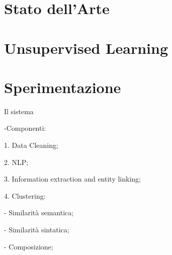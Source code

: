 \documentclass[a4paper,12pt,oneside]{book}
\begin{document}
\label{cap:capitoloIntro}

\chapter{Stato dell'Arte}
\label{cap:capitolo1}

\chapter{Unsupervised Learning}
\label{cap:capitolo2}

\chapter{Sperimentazione}
\color{red}
Il sistema

-Componenti:

1. Data Cleaning;

2. NLP;

3. Information extraction and entity linking;

4. Clustering:

	- Similarità semantica;
	
    - Similarità sintatica;
    
    - Composizione;
 			

\color{black}
\label{cap:capitolo5}



%
%
%

\end{document}
